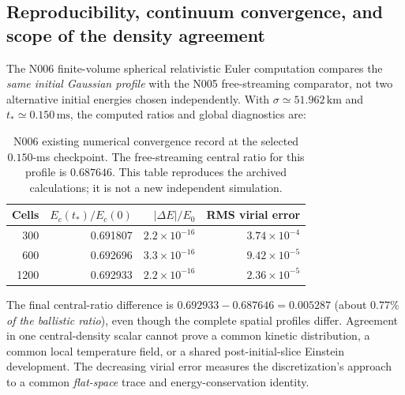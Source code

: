 \documentclass[11pt,a4paper]{article}
\theoremstyle{tmon}
\theoremstyle{definition}
\begin{document}
\subsection{Reproducibility, continuum convergence, and scope of the density agreement}
The N006 finite-volume spherical relativistic Euler computation compares the \emph{same initial Gaussian profile} with the N005 free-streaming comparator, not two alternative initial energies chosen independently. With $\sigma\simeq51.962\,\mathrm{km}$ and $t_*\simeq0.150\,\mathrm{ms}$, the computed ratios and global diagnostics are:
\begin{table}[htbp]\centering\small
\begin{tabular}{@{}rrrr@{}}\toprule
Cells & $E_c(t_*)/E_c(0)$ & $|\Delta E|/E_0$ & RMS virial error\\\midrule
300 & 0.691807 & $2.2\times10^{-16}$ & $3.74\times10^{-4}$\\
600 & 0.692696 & $3.3\times10^{-16}$ & $9.42\times10^{-5}$\\
1200 & 0.692933 & $2.2\times10^{-16}$ & $2.36\times10^{-5}$\\\bottomrule
\end{tabular}
\caption{N006 existing numerical convergence record at the selected $0.150$-ms checkpoint. The free-streaming central ratio for this profile is $0.687646$. This table reproduces the archived calculations; it is not a new independent simulation.}\label{tab:n006conv}
\end{table}
The final central-ratio difference is $0.692933-0.687646=0.005287$ (about $0.77\%$ \emph{of the ballistic ratio}), even though the complete spatial profiles differ. Agreement in one central-density scalar cannot prove a common kinetic distribution, a common local temperature field, or a shared post-initial-slice Einstein development. The decreasing virial error measures the discretization's approach to a common \emph{flat-space} trace and energy-conservation identity.
\end{document}
